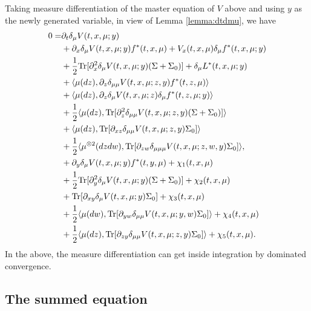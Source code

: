 \documentclass{amsart}
\theoremstyle{definition}
\theoremstyle{remark}
\def\D{\partial}
\numberwithin{equation}{section}
\begin{document}
Taking measure differentiation of the master equation of $V$ above and using $y$ as the newly generated variable, in view of Lemma \ref{lemma:dtdmu},
we have
{\allowdisplaybreaks
\begin{align}
0=& \partial_t\delta_\mu V(t, x, \mu;y) \label{pdedelV}  \\
  &+  \partial_{x} \delta_\mu V (t, x, \mu;y)
f^*(t,x,  \mu) +    V_x (t, x, \mu)
\delta_\mu f^*(t,x,  \mu;y)
 \notag \\
&+ \frac{1}{2} {\rm Tr}
[\partial_{x}^2\delta_\mu V(t, x, \mu;y)(\Sigma+ \Sigma_0) ]     +\delta_\mu L^*(t,x,  \mu;y)  \notag \\
& +\langle  \mu(dz), \partial_z\delta_{\mu\mu} V(t,x, \mu; z,y) f^*(t, z,\mu)\rangle \notag  \\
&+\langle  \mu(dz), \D_z\delta_\mu V(t,x, \mu; z)\delta_\mu f^*(t, z,\mu;y)\rangle \notag  \\
&\hskip -0cm +\frac{1}{2}\langle  \mu(dz), {\rm Tr}[
\D_{z}^2 \delta_{\mu\mu}
V(t, x, \mu; z,y) (\Sigma+\Sigma_0)]\rangle \notag \\
&+ \langle \mu(dz), {\rm Tr} [ \D_{xz}\delta_{\mu\mu} V(t,x, \mu;z,y)  \Sigma_0 ]\rangle \notag  \\
&+\frac{1}{2}\langle\mu^{\otimes2}(dzdw), {\rm Tr}[\D_{zw}\delta_{\mu\mu\mu}
 V (t, x, \mu; z,w,y)
\Sigma_0]\rangle ,\notag\\
&+ \D_y\delta_\mu V(t,x, \mu; y) f^*(t, y,\mu) +\chi_1(t,x,\mu) \notag  \\
& + \frac{1}{2} {\rm Tr}[
\D_{y}^2 \delta_\mu
V(t, x, \mu; y) (\Sigma+\Sigma_0)]+\chi_2(t,x,\mu)\notag  \\
&+  {\rm Tr} [ \D_{xy}\delta_\mu V(t,x, \mu;y)  \Sigma_0 ]+\chi_3(t,x,\mu)  \notag  \\
& + \frac{1}{2}\langle\mu(dw), {\rm Tr}[\D_{yw}\delta_{\mu\mu} V (t, x, \mu; y,w)
\Sigma_0]\rangle+\chi_4(t,x,\mu)\notag  \\
& + \frac{1}{2}\langle\mu(dz), {\rm Tr}[\D_{zy}\delta_{\mu\mu} V (t, x, \mu; z,y)
\Sigma_0]\rangle+\chi_5(t,x,\mu). \notag
\end{align}
}
In the above, the measure differentiation can get inside integration by dominated convergence.

\subsection{The summed equation}
\end{document}
